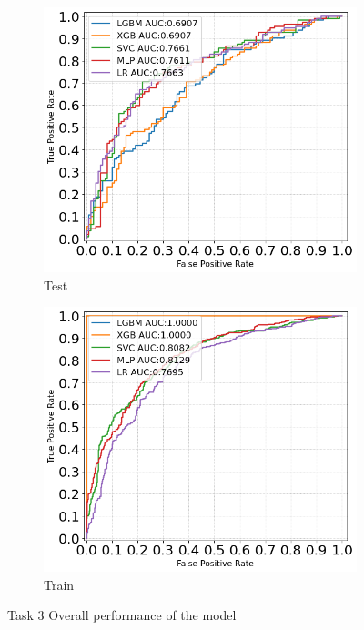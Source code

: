 \documentclass[12pt]{article}
\begin{document}
\begin{figure}[H]
      \centering
      \begin{subfigure}{0.48\textwidth} %
          \includegraphics[width=\linewidth]{task3_auc_test.png} %
          \caption{Test}
          \label{fig:roctest}
      \end{subfigure}
      \hfill %
      \begin{subfigure}{0.48\textwidth} %
          \includegraphics[width=\linewidth]{task3_auc_train.png} %
          \caption{Train}
          \label{fig:roctrain}
      \end{subfigure}
      \caption{Task 3 Overall performance of the model}
      \label{fig:overall}
\end{figure}
\end{document}
